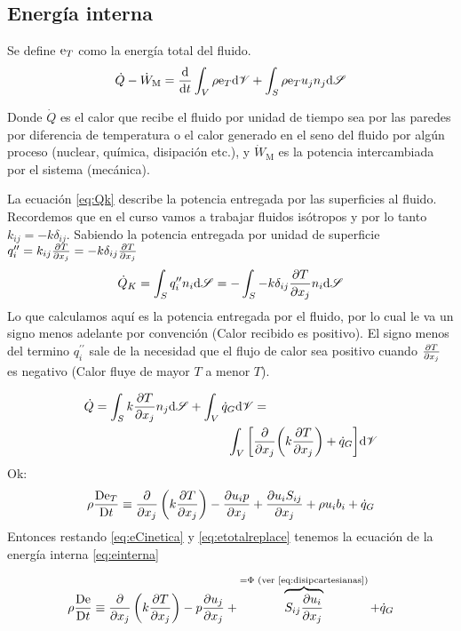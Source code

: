 \subsection{Energía interna}
Se define $\textrm{e}_T$ como la energía total del fluido.
\begin{equation}\label{eq:etotal}
    \dot{Q}-\dot{W}_\textrm{M}=\frac{\textrm{d} }{\textrm{d} t}\int_V \rho \textrm{e}_T \textrm{d} \mathscr{V} +\int_S \rho \textrm{e}_T u_j n_j \textrm{d} \mathscr{S}
\end{equation}

Donde $\dot{Q}$ es el calor que recibe el fluido por unidad de tiempo sea por las paredes por diferencia de temperatura o el calor generado en el seno del fluido por algún proceso (nuclear, química, disipación etc.), y $\dot{W}_\textrm{M}$ es la potencia intercambiada por el sistema (mecánica).


 La ecuación \ref{eq:Qk} describe la potencia entregada por las superficies al fluido. Recordemos que en el curso vamos a trabajar fluidos isótropos y por lo tanto $k_{ij}=-k \delta_{ij}$. Sabiendo la potencia entregada por unidad de superficie $q_i^{\prime \prime}=k_{ij}\frac{\partial T}{\partial x_j}=-k\delta_{ij}\frac{\partial T}{\partial x_j}$ 
\begin{equation}\label{eq:Qk}
    \dot{Q}_K=\int_S q_i^{\prime \prime} n_i \textrm{d} \mathscr{S} = -\int_S - k\delta_{ij}\frac{\partial T}{\partial x_j}n_i \textrm{d} \mathscr{S}
\end{equation}
Lo que calculamos aquí es la potencia entregada por el fluido, por lo cual le va un signo menos adelante por convención (Calor recibido es positivo). El signo menos del termino $q_i^{\prime \prime} $ sale de la necesidad que el flujo de calor sea positivo cuando $\frac{\partial T}{\partial x_j}$ es negativo (Calor fluye de mayor $T$ a menor $T$).


\begin{align*}
    \dot{Q}=\int_S k\frac{\partial T}{\partial x_j} n_j \textrm{d} \mathscr{S} + \int_V \dot{q}_G \textrm{d} \mathscr{V} &=\\
    \int_V \bigg[ &\frac{\partial  }{\partial x_j} \bigg( k   \frac{\partial T}{\partial x_j} \bigg) + \dot{q}_G \bigg] \textrm{d} \mathscr{V}
\end{align*}
Ok:
\begin{equation} \label{eq:etotalreplace}
    \rho \frac{\textrm{D} \textrm{e}_T}{\textrm{D} t}\equiv \frac{\partial }{\partial x_j}\left(k\frac{\partial T}{\partial x_j}\right) - \frac{\partial u_i p}{\partial x_j}+\frac{\partial u_i S_{ij}}{\partial x_j}+\rho u_i b_i+\dot{q}_G
\end{equation}
Entonces restando \ref{eq:eCinetica} y \ref{eq:etotalreplace} tenemos la ecuación de la energía interna \ref{eq:einterna}

\begin{equation} \label{eq:einterna}
    \rho \frac{\textrm{D} \textrm{e}}{\textrm{D} t}\equiv \frac{\partial }{\partial x_j}\left( k\frac{\partial T}{\partial x_j}\right) - p \frac{\partial u_j}{\partial x_j} +\overbrace{S_{ij} \frac{\partial u_i}{\partial x_j}}^{=\Phi \textrm{ (ver \eqref{eq:disipcartesianas})}}+\dot{q}_G
\end{equation}